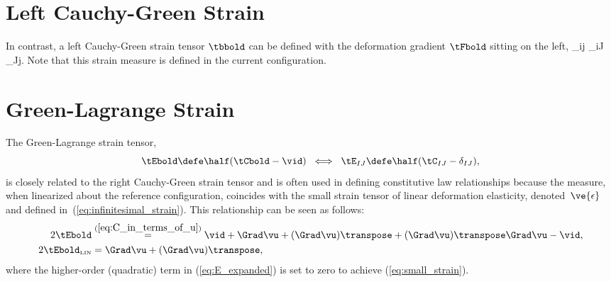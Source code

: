 \section{Left Cauchy-Green Strain}
In contrast, a left Cauchy-Green
strain tensor $\tbbold$ can be defined with the 
deformation gradient $\tFbold$
sitting on the left, 
\be
 \tbbold {} \tFbold \tFbold\transpose
 \;\; \Longleftrightarrow \;\;
 \tb_{ij}  \tF_{iJ} \; \tF_{Jj}.
 \label{eq:left_cauchy_green}
\ee
Note that this strain measure is defined in the current 
configuration.

\section{Green-Lagrange Strain}
The Green-Lagrange strain tensor,
\begin{equation}
 \tEbold 
 \defe
 \half (\tCbold - \vid)
 \;\; \Longleftrightarrow \;\;
 \tE_{IJ} 
 \defe 
 \half(\tC_{IJ} - \delta_{IJ}),
\end{equation}
is closely related to the right Cauchy-Green strain tensor
and is often used in defining constitutive
law relationships because the measure, when linearized
about the reference configuration, coincides with the
small strain tensor of linear deformation elasticity, 
denoted~$\ve{\epsilon}$ and defined 
in~(\ref{eq:infinitesimal_strain}).
This relationship can be seen as follows:
\begin{align}
 2 \tEbold 
     &\overset{(\ref{eq:C_in_terms_of_u})}{=} 
     \vid + \Grad \vu + (\Grad \vu)\transpose + 
     (\Grad \vu)\transpose \Grad \vu 
     - \vid,
     \label{eq:E_expanded} \\
 2 \tEbold_{\tiny \mbox{LIN}}
     &= 
     \Grad \vu + (\Grad \vu)\transpose,
     \label{eq:small_strain}
\end{align}
where the higher-order (quadratic) term in (\ref{eq:E_expanded}) is set
to zero to achieve (\ref{eq:small_strain}).

